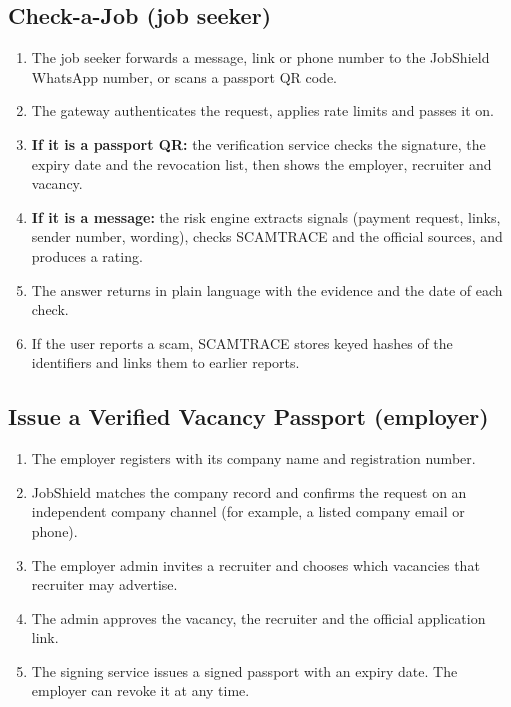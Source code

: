 \documentclass[11pt,a4paper]{article}
\begin{document}
\subsection{Check-a-Job (job seeker)}
\begin{enumerate}
  \item The job seeker forwards a message, link or phone number to the JobShield WhatsApp number, or scans a passport QR code.
  \item The gateway authenticates the request, applies rate limits and passes it on.
  \item \textbf{If it is a passport QR:} the verification service checks the signature, the expiry date and the revocation list, then shows the employer, recruiter and vacancy.
  \item \textbf{If it is a message:} the risk engine extracts signals (payment request, links, sender number, wording), checks SCAMTRACE and the official sources, and produces a rating.
  \item The answer returns in plain language with the evidence and the date of each check.
  \item If the user reports a scam, SCAMTRACE stores keyed hashes of the identifiers and links them to earlier reports.
\end{enumerate}

\subsection{Issue a Verified Vacancy Passport (employer)}
\begin{enumerate}
  \item The employer registers with its company name and registration number.
  \item JobShield matches the company record and confirms the request on an independent company channel (for example, a listed company email or phone).
  \item The employer admin invites a recruiter and chooses which vacancies that recruiter may advertise.
  \item The admin approves the vacancy, the recruiter and the official application link.
  \item The signing service issues a signed passport with an expiry date. The employer can revoke it at any time.
\end{enumerate}
\end{document}
